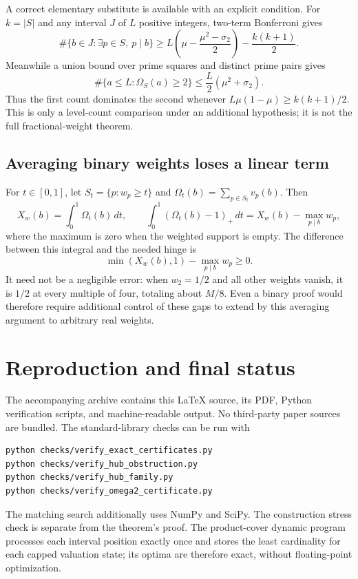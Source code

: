 \documentclass[11pt,a4paper]{article}
\theoremstyle{remark}
\newcommand{\pos}[1]{\left(#1\right)_+}
\begin{document}
A correct elementary substitute is available with an explicit condition.
For $k=|S|$ and any interval $J$ of $L$ positive integers, two-term
Bonferroni gives
\[
 \#\{b\in J:\exists p\in S,\ p\mid b\}
 \ge L\left(\mu-\frac{\mu^2-\sigma_2}{2}\right)
      -\frac{k(k+1)}2.
\]
Meanwhile a union bound over prime squares and distinct prime pairs gives
\[
 \#\{a\le L:\Omega_S(a)\ge2\}
 \le\frac L2(\mu^2+\sigma_2).
\]
Thus the first count dominates the second whenever
$L\mu(1-\mu)\ge k(k+1)/2$. This is only a level-count comparison under
an additional hypothesis; it is not the full fractional-weight theorem.

\subsection{Averaging binary weights loses a linear term}
For $t\in[0,1]$, let $S_t=\{p:w_p\ge t\}$ and
$\Omega_t(b)=\sum_{p\in S_t}v_p(b)$. Then
\[
 X_w(b)=\int_0^1\Omega_t(b)\,dt,\qquad
 \int_0^1\pos{\Omega_t(b)-1}\,dt
 =X_w(b)-\max_{p\mid b}w_p,
\]
where the maximum is zero when the weighted support is empty. The
difference between this integral and the needed hinge is
\[
 \min(X_w(b),1)-\max_{p\mid b}w_p\ge0.
\]
It need not be a negligible error: when $w_2=1/2$ and all other weights
vanish, it is $1/2$ at every multiple of four, totaling about $M/8$.
Even a binary proof would therefore require additional control of these
gaps to extend by this averaging argument to arbitrary real weights.

\section{Reproduction and final status}
The accompanying archive contains this \LaTeX{} source, its PDF, Python
verification scripts, and machine-readable output. No third-party paper
sources are bundled. The standard-library checks can be run with
\begin{verbatim}
python checks/verify_exact_certificates.py
python checks/verify_hub_obstruction.py
python checks/verify_hub_family.py
python checks/verify_omega2_certificate.py
\end{verbatim}
The matching search additionally uses NumPy and SciPy. The construction
stress check is separate from the theorem's proof. The product-cover
dynamic program processes each interval position exactly once and stores
the least cardinality for each capped valuation state; its optima are
therefore exact, without floating-point optimization.
\end{document}
